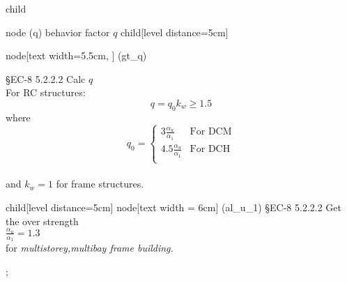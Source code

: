     child {node (q) {behavior factor $q$}
      child[level distance=5cm] {node[text width=5.5cm,
        ] (gt_q) {
          \begin{minipage}{1.0\linewidth}
            \S EC-8 5.2.2.2 Calc $q$\\
            \smallskip
            For RC structures:
            \[q = q_0 k_w \ge 1.5\] 
            where
            \[ q_0 =
            \begin{cases}
              3\frac{\alpha_u}{\alpha_1} & \mbox{For DCM} \\
              4.5\frac{\alpha_u}{\alpha_1} & \mbox{For DCH} \\
            \end{cases}
            \]
            \\
            and $k_w=1$ for frame structures.
          \end{minipage}
          }
          child[level distance=5cm] {
            node[text width = 6cm] (al_u_1) {
              \S EC-8 5.2.2.2 Get the over strength \\
              $\frac{\alpha_u}{\alpha_1} = 1.3$ \\
              for \emph{multistorey,multibay frame building.}
          }
          }
        }
    };

